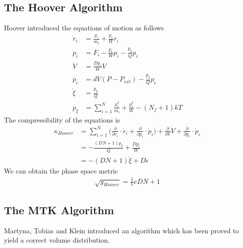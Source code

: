 \documentclass{article}
\begin{document}
\subsection{The Hoover Algorithm}
Hoover introduced the equations of motion as follows
\begin{align}
\dot{r}_i&=\frac{p_i}{m_i}+\frac{p_{\epsilon}}{W}r_i\nonumber\\ 
\dot{p}_i&=F_i-\frac{p_{\epsilon}}{W}p_i-\frac{p_{\xi}}{Q}p_i\nonumber\\
\dot{V}&=\frac{Dp_{\epsilon}}{W}V\nonumber\\
\dot{p_{\epsilon}}&=dV(P-P_{ext})-\frac{p_{\xi}}{Q}p_{\epsilon}\\
\dot{\xi}&=\frac{p_{\xi}}{Q}\nonumber\\
\dot{p_{\xi}}&=\sum^N_{i=1}\frac{p_i^2}{m_i}+\frac{p_{\epsilon}^2}{W}-(N_f+1)kT\nonumber
\end{align}
The compressibility of the equations is
\begin{align}
\kappa_{Hoover}&=\sum_{i=1}^N\bigg(\frac{\partial}{\partial r_i}\cdot\dot{r}_i+\frac{\partial}{\partial p_i}\cdot\dot{p}_i\bigg)+\frac{\partial}{\partial V}\dot{V}+\frac{\partial}{\partial p_{\epsilon}}\cdot\dot{p}_{\epsilon}\nonumber\\
&=-\frac{(DN+1)p_{\xi}}{Q}+\frac{Dp_{\epsilon}}{W}\\
&=-(DN+1)\dot{\xi}+D\dot{\epsilon}\nonumber
\end{align}
We can obtain the phase space metric 
\begin{align}
\sqrt{g_{Hoover}}=\frac{1}{V}e{DN+1}
\end{align}

\subsection{The MTK Algorithm}
Martyna, Tobias and Klein introduced an algorithm which has been proved to yield a correct volume distribution.
\end{document}
